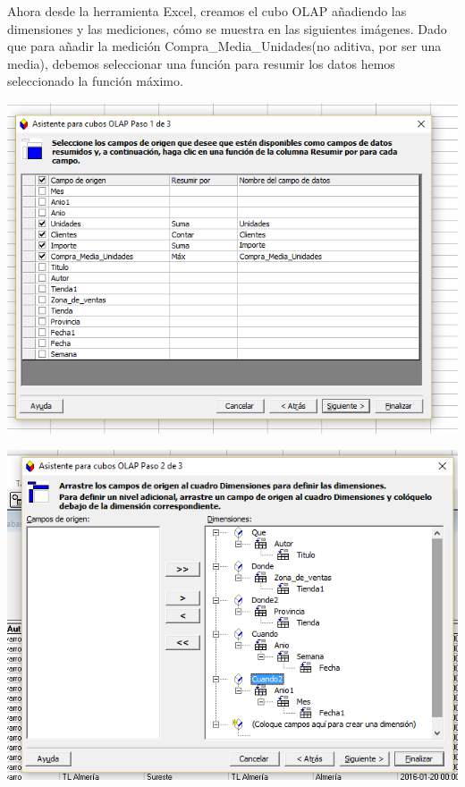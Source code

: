 \documentclass[paper=a4, fontsize=11pt, spanish]{scrartcl}
\numberwithin{equation}{section} %
\numberwithin{figure}{section} %
\numberwithin{table}{section} %
\begin{document}
Ahora desde la herramienta Excel, creamos el cubo OLAP añadiendo las dimensiones y las mediciones, cómo se muestra en las siguientes imágenes. Dado que para añadir la medición Compra\_Media\_Unidades(no aditiva, por ser una media), debemos seleccionar una función para resumir los datos hemos seleccionado la función máximo.
\begin{center}
	\includegraphics[scale=0.75]{img7.png}
	
	\medskip 	
	
	\includegraphics[scale=0.75]{img8.png}
\end{center}
\end{document}
